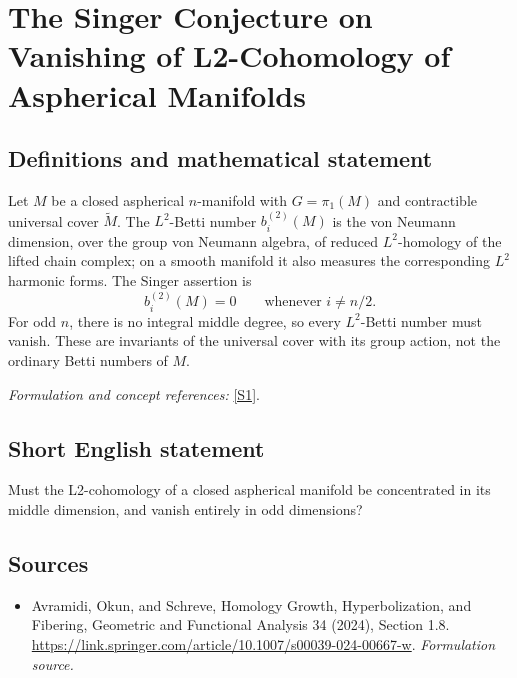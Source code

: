 \documentclass[11pt]{article}
\begin{document}
\section*{\texorpdfstring{The Singer Conjecture on Vanishing of L2-Cohomology of Aspherical Manifolds}{The Singer Conjecture on Vanishing of L2-Cohomology of Aspherical Manifolds}}\label{30006819}
\subsection{Definitions and mathematical statement}
Let $M$ be a closed aspherical $n$-manifold with $G=\pi_1(M)$ and contractible universal cover $\widetilde M$. The $L^2$-Betti number $b_i^{(2)}(M)$ is the von Neumann dimension, over the group von Neumann algebra, of reduced $L^2$-homology of the lifted chain complex; on a smooth manifold it also measures the corresponding $L^2$ harmonic forms. The Singer assertion is
\[
 b_i^{(2)}(M)=0\qquad\text{whenever }i\ne n/2.
\]
For odd $n$, there is no integral middle degree, so every $L^2$-Betti number must vanish. These are invariants of the universal cover with its group action, not the ordinary Betti numbers of $M$.
\par\smallskip\textit{Formulation and concept references:} \href{https://link.springer.com/article/10.1007/s00039-024-00667-w}{[S1]}.

\subsection{Short English statement}
Must the L2-cohomology of a closed aspherical manifold be concentrated in its middle dimension, and vanish entirely in odd dimensions?
\subsection{Sources}
\begin{itemize}
\item[S1]Avramidi, Okun, and Schreve, Homology Growth, Hyperbolization, and Fibering, Geometric and Functional Analysis 34 (2024), Section 1.8.
\url{https://link.springer.com/article/10.1007/s00039-024-00667-w}.
\textit{Formulation source.}
\end{itemize}
\end{document}
